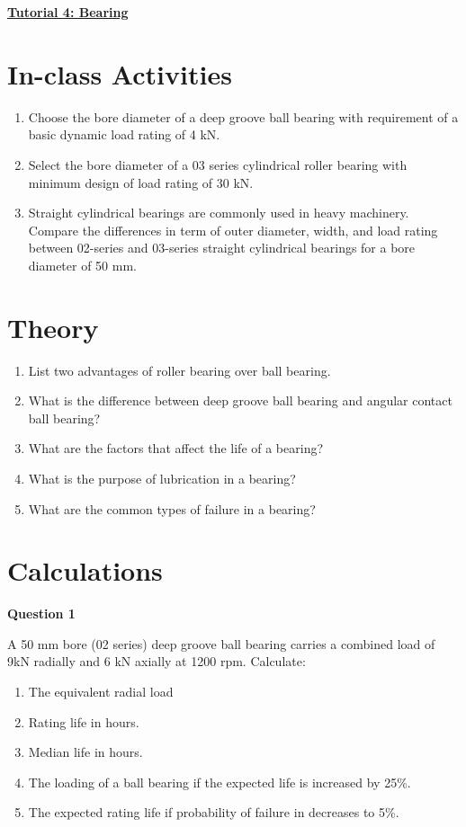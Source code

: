 \documentclass[a4paper, fleqn]{article}
\begin{document}
\underline{\textbf{Tutorial 4: Bearing}}
\vspace{10pt}

\section*{In-class Activities}
\begin{enumerate}
    \item Choose the bore diameter of a deep groove ball bearing with requirement of a basic dynamic load rating of 4 kN.
    \item Select the bore diameter of a 03 series cylindrical roller bearing with minimum design of load rating of 30 kN.
    \item Straight cylindrical bearings are commonly used in heavy machinery. Compare the differences in term of outer diameter, width, and load rating between 02-series and 03-series straight cylindrical bearings for a bore diameter of 50 mm.
\end{enumerate}

\section*{Theory}
\begin{enumerate}
    \item List two advantages of roller bearing over ball bearing.
    \item What is the difference between deep groove ball bearing and angular contact ball bearing?
    \item What are the factors that affect the life of a bearing?
    \item What is the purpose of lubrication in a bearing?
    \item What are the common types of failure in a bearing?
\end{enumerate}

\section*{Calculations}
\textbf{Question 1}

A 50 mm bore (02 series) deep groove ball bearing carries a combined load of 9kN radially and 6 kN axially at 1200 rpm. Calculate:

\begin{enumerate}[label=(\roman*)]
    \item The equivalent radial load
    \item Rating life in hours.
    \item Median life in hours.
    \item The loading of a ball bearing if the expected life is increased by 25\%.
    \item The expected rating life if probability of failure in decreases to 5\%.
\end{enumerate}
\end{document}
